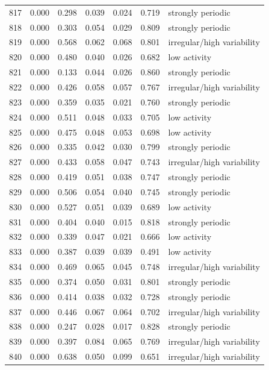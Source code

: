 \begin{longtable}{lrrrrrl}
817 & 0.000 & 0.298 & 0.039 & 0.024 & 0.719 & strongly periodic \\
818 & 0.000 & 0.303 & 0.054 & 0.029 & 0.809 & strongly periodic \\
819 & 0.000 & 0.568 & 0.062 & 0.068 & 0.801 & irregular/high variability \\
820 & 0.000 & 0.480 & 0.040 & 0.026 & 0.682 & low activity \\
821 & 0.000 & 0.133 & 0.044 & 0.026 & 0.860 & strongly periodic \\
822 & 0.000 & 0.426 & 0.058 & 0.057 & 0.767 & irregular/high variability \\
823 & 0.000 & 0.359 & 0.035 & 0.021 & 0.760 & strongly periodic \\
824 & 0.000 & 0.511 & 0.048 & 0.033 & 0.705 & low activity \\
825 & 0.000 & 0.475 & 0.048 & 0.053 & 0.698 & low activity \\
826 & 0.000 & 0.335 & 0.042 & 0.030 & 0.799 & strongly periodic \\
827 & 0.000 & 0.433 & 0.058 & 0.047 & 0.743 & irregular/high variability \\
828 & 0.000 & 0.419 & 0.051 & 0.038 & 0.747 & strongly periodic \\
829 & 0.000 & 0.506 & 0.054 & 0.040 & 0.745 & strongly periodic \\
830 & 0.000 & 0.527 & 0.051 & 0.039 & 0.689 & low activity \\
831 & 0.000 & 0.404 & 0.040 & 0.015 & 0.818 & strongly periodic \\
832 & 0.000 & 0.339 & 0.047 & 0.021 & 0.666 & low activity \\
833 & 0.000 & 0.387 & 0.039 & 0.039 & 0.491 & low activity \\
834 & 0.000 & 0.469 & 0.065 & 0.045 & 0.748 & irregular/high variability \\
835 & 0.000 & 0.374 & 0.050 & 0.031 & 0.801 & strongly periodic \\
836 & 0.000 & 0.414 & 0.038 & 0.032 & 0.728 & strongly periodic \\
837 & 0.000 & 0.446 & 0.067 & 0.064 & 0.702 & irregular/high variability \\
838 & 0.000 & 0.247 & 0.028 & 0.017 & 0.828 & strongly periodic \\
839 & 0.000 & 0.397 & 0.084 & 0.065 & 0.769 & irregular/high variability \\
840 & 0.000 & 0.638 & 0.050 & 0.099 & 0.651 & irregular/high variability \\

\end{longtable}
